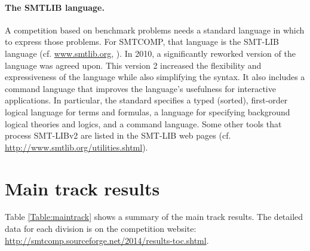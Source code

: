 \documentclass[twosize,11pt]{article}
\begin{document}
\paragraph{The SMTLIB language.} A competition based on benchmark problems needs a standard language in which to express those problems.
For SMTCOMP, that language is the SMT-LIB language (cf. \url{www.smtlib.org}, \cite{BarST-SMT-10} \cite{Cok-SMTLIBTutorial-2011}). 
In 2010, a significantly reworked version of the language was agreed upon.
This version 2 increased the flexibility and expressiveness of the language while also simplifying the syntax. 
It also includes a command language that improves the language's usefulness for interactive applications.
In particular, the standard specifies a typed (sorted), first-order logical language for terms and formulas, a language for specifying background logical theories and logics, and a command language. Some other tools that process SMT-LIBv2 are listed in the SMT-LIB web pages (cf. \url{http://www.smtlib.org/utilities.shtml}).

\section{Main track results}
\label{sec:main-results}

Table \ref{Table:maintrack} shows a summary of the main track results. The detailed data for each division is on the competition website: \url{http://smtcomp.sourceforge.net/2014/results-toc.shtml}.
 
\end{document}
